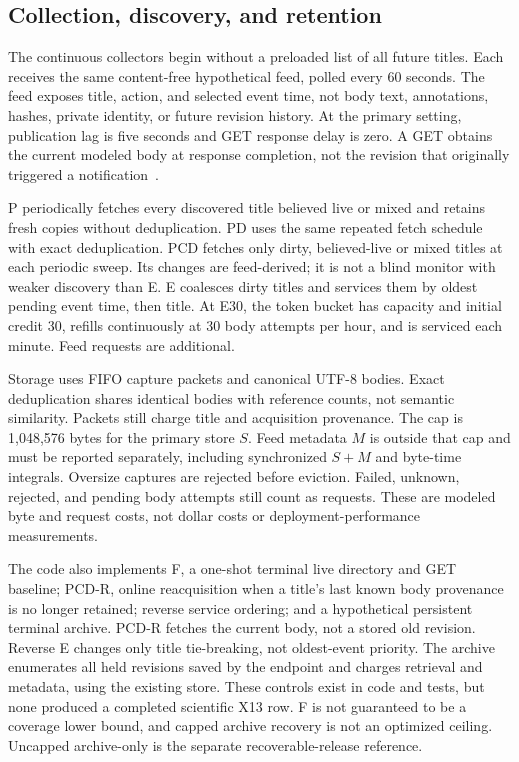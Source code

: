 \documentclass[11pt]{article}
\begin{document}
\subsection{Collection, discovery, and retention}
The continuous collectors begin without a preloaded list of all future titles. Each receives the same content-free hypothetical feed, polled every 60 seconds. The feed exposes title, action, and selected event time, not body text, annotations, hashes, private identity, or future revision history. At the primary setting, publication lag is five seconds and GET response delay is zero. A GET obtains the current modeled body at response completion, not the revision that originally triggered a notification~\cite{code,contract}.

P periodically fetches every discovered title believed live or mixed and retains fresh copies without deduplication. PD uses the same repeated fetch schedule with exact deduplication. PCD fetches only dirty, believed-live or mixed titles at each periodic sweep. Its changes are feed-derived; it is not a blind monitor with weaker discovery than E. E coalesces dirty titles and services them by oldest pending event time, then title. At E30, the token bucket has capacity and initial credit 30, refills continuously at 30 body attempts per hour, and is serviced each minute. Feed requests are additional.

Storage uses FIFO capture packets and canonical UTF-8 bodies. Exact deduplication shares identical bodies with reference counts, not semantic similarity. Packets still charge title and acquisition provenance. The cap is 1,048,576 bytes for the primary store $S$. Feed metadata $M$ is outside that cap and must be reported separately, including synchronized $S+M$ and byte-time integrals. Oversize captures are rejected before eviction. Failed, unknown, rejected, and pending body attempts still count as requests. These are modeled byte and request costs, not dollar costs or deployment-performance measurements.

The code also implements F, a one-shot terminal live directory and GET baseline; PCD-R, online reacquisition when a title's last known body provenance is no longer retained; reverse service ordering; and a hypothetical persistent terminal archive. PCD-R fetches the current body, not a stored old revision. Reverse E changes only title tie-breaking, not oldest-event priority. The archive enumerates all held revisions saved by the endpoint and charges retrieval and metadata, using the existing store. These controls exist in code and tests, but none produced a completed scientific X13 row. F is not guaranteed to be a coverage lower bound, and capped archive recovery is not an optimized ceiling. Uncapped archive-only is the separate recoverable-release reference.
\end{document}
